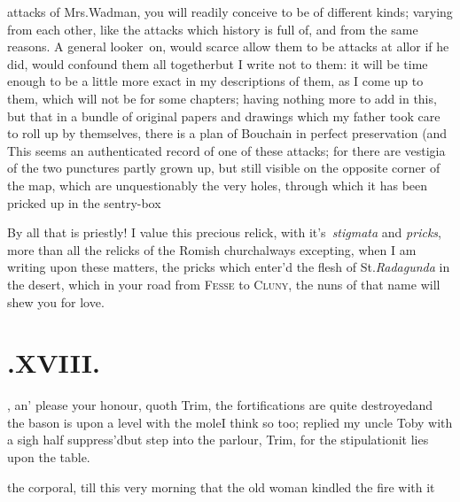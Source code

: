 \documentclass{article}
\begin{document}
 attacks of Mrs.\@ Wadman,
you will readily conceive to be of different kinds; varying from
each other, like the attacks which history is full of, and from the
same reasons. A general looker~on, would scarce allow them to be
attacks at all\tsh or if he did, would confound them all
together\tsh but I write not to them: it will be time
enough to be a little more exact in my descriptions of them, as I
come up to them, which will not be for some chapters; having
nothing more to add in this, but that in a bundle of original
papers and drawings which my father took care to roll up by
themselves, there is a plan of
Bouchain in perfect preservation (and
This seems an
authenticated record of one of these attacks; for there are
vestigia of the two punctures partly grown up, but still visible on
the opposite corner of the map, which are unquestionably the very
holes, through which it has been pricked up in the
sentry-box\tsh

By all that is priestly! I value this precious relick, with it’s\sic\ 
\textit{stigmata} and
\textit{pricks}, more than all the relicks of the
Romish church\tsh always excepting, when I am
writing upon these matters, the pricks which enter’d the flesh of
St.\@ \textit{Radagunda} in the desert, which in your road from
\textsc{Fesse} to \textsc{Cluny}, the nuns of that name
will shew you for love.

\medskip

\section{.\enspace XVIII.}

, an’ please your
honour, quoth Trim, the fortifications are quite
destroyed\tsh and the bason is upon a level with the
mole\tsh I think so too; replied my uncle Toby with
a sigh half suppress’d\tsh but step into the
parlour, Trim, for the stipulation\tsh it lies upon
the table.

\noindent
{}
the corporal, till
this very morning that the old woman kindled the fire with
it\tsk
\end{document}
